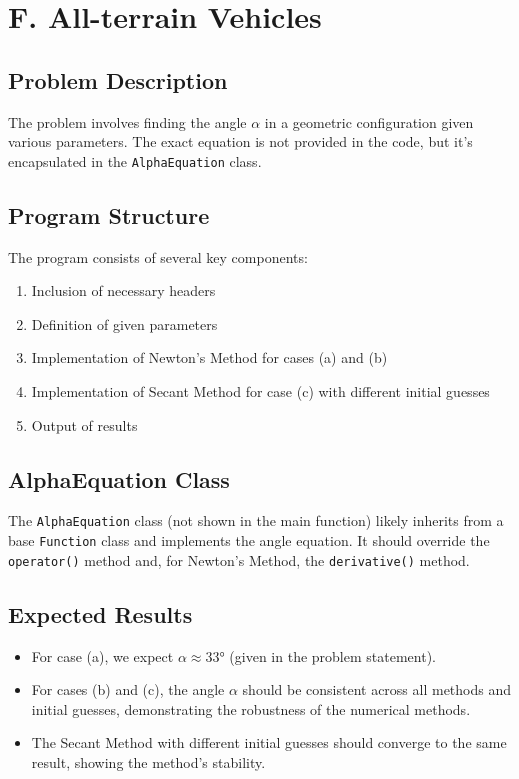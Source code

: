 \documentclass{article}
\begin{document}
\section{F. All-terrain Vehicles}
\subsection{Problem Description}
The problem involves finding the angle $\alpha$ in a geometric configuration given various parameters. The exact equation is not provided in the code, but it's encapsulated in the \texttt{AlphaEquation} class.
\subsection{Program Structure}
The program consists of several key components:
\begin{enumerate}
\item Inclusion of necessary headers
\item Definition of given parameters
\item Implementation of Newton's Method for cases (a) and (b)
\item Implementation of Secant Method for case (c) with different initial guesses
\item Output of results
\end{enumerate}

\subsection{AlphaEquation Class}
The \texttt{AlphaEquation} class (not shown in the main function) likely inherits from a base \texttt{Function} class and implements the angle equation. It should override the \texttt{operator()} method and, for Newton's Method, the \texttt{derivative()} method.

\subsection{Expected Results}
\begin{itemize}
\item For case (a), we expect $\alpha \approx 33°$ (given in the problem statement).
\item For cases (b) and (c), the angle $\alpha$ should be consistent across all methods and initial guesses, demonstrating the robustness of the numerical methods.
\item The Secant Method with different initial guesses should converge to the same result, showing the method's stability.
\end{itemize}
\end{document}
